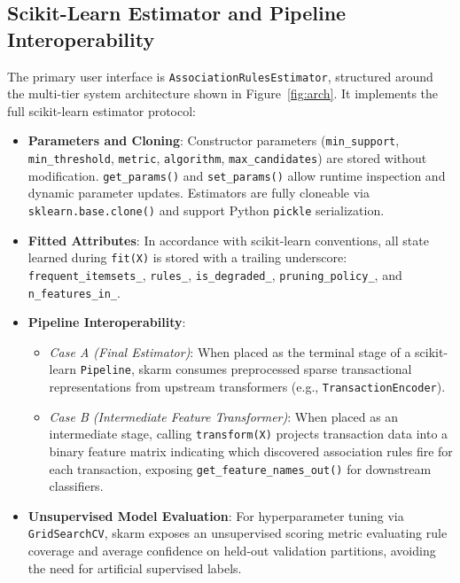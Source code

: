 \documentclass[twocolumn,10pt]{article}
\newcommand{\skarm}{\textsf{skarm}\xspace}
\begin{document}
\subsection{Scikit-Learn Estimator and Pipeline Interoperability}
\label{sec:api_contracts}
The primary user interface is \texttt{AssociationRulesEstimator}, structured around the multi-tier system architecture shown in Figure~\ref{fig:arch}. It implements the full scikit-learn estimator protocol:
\begin{itemize}
  \item \textbf{Parameters and Cloning}: Constructor parameters (\texttt{min\_support}, \texttt{min\_threshold}, \texttt{metric}, \texttt{algorithm}, \texttt{max\_candidates}) are stored without modification. \texttt{get\_params()} and \texttt{set\_params()} allow runtime inspection and dynamic parameter updates. Estimators are fully cloneable via \texttt{sklearn.base.clone()} and support Python \texttt{pickle} serialization.
  \item \textbf{Fitted Attributes}: In accordance with scikit-learn conventions, all state learned during \texttt{fit(X)} is stored with a trailing underscore: \texttt{frequent\_itemsets\_}, \texttt{rules\_}, \texttt{is\_degraded\_}, \texttt{pruning\_policy\_}, and \texttt{n\_features\_in\_}.
  \item \textbf{Pipeline Interoperability}:
    \begin{itemize}
      \item \emph{Case A (Final Estimator)}: When placed as the terminal stage of a scikit-learn \texttt{Pipeline}, \skarm consumes preprocessed sparse transactional representations from upstream transformers (e.g., \texttt{TransactionEncoder}).
      \item \emph{Case B (Intermediate Feature Transformer)}: When placed as an intermediate stage, calling \texttt{transform(X)} projects transaction data into a binary feature matrix indicating which discovered association rules fire for each transaction, exposing \texttt{get\_feature\_names\_out()} for downstream classifiers.
    \end{itemize}
  \item \textbf{Unsupervised Model Evaluation}: For hyperparameter tuning via \texttt{GridSearchCV}, \skarm exposes an unsupervised scoring metric evaluating rule coverage and average confidence on held-out validation partitions, avoiding the need for artificial supervised labels.
\end{itemize}
\end{document}
